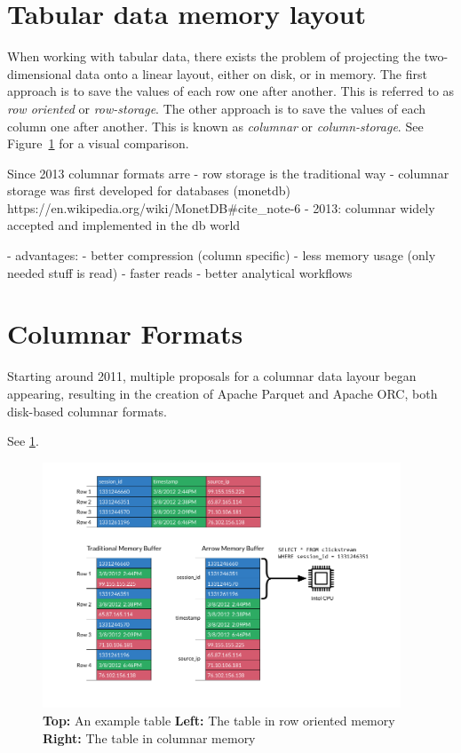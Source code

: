 \section{Tabular data memory layout}
\label{section:column_vs_row}
When working with tabular data, there exists the problem of projecting the two-dimensional data onto a linear layout, either on disk, or in memory.
The first approach is to save the values of each row one after another. This is referred to as \emph{row oriented} or \emph{row-storage}.
The other approach is to save the values of each column one after another. This is known as \emph{columnar} or \emph{column-storage}.
See Figure~\ref{fig:row_v_col} for a visual comparison.
\autocite{Floratou2019}


Since 2013 columnar formats arre
- row storage is the traditional way
- columnar storage was first developed for databases (monetdb)
https://en.wikipedia.org/wiki/MonetDB#cite_note-6
- 2013: columnar widely accepted and implemented in the db world
\autocite{Abadi2013}

- advantages:
- better compression (column specific)
- less memory usage (only needed stuff is read)
\autocite{Abadi2013}
- faster reads
- better analytical workflows
\autocite{Floratou2019}


\section{Columnar Formats}
\label{section:columnar}
Starting around 2011, multiple proposals for a columnar data layour began appearing, resulting in the creation of Apache Parquet and Apache ORC, both disk-based columnar formats.

See \ref{fig:row_v_col}.
\begin{figure}
	\begin{center}
		\includegraphics[width=0.95\textwidth]{resources/columnar}
	\end{center}
	\caption{\textbf{Top:} An example table \textbf{Left:} The table in row oriented memory \textbf{Right:} The table in columnar memory \autocite{arrow:overview}}
	\label{fig:row_v_col}
\end{figure}



